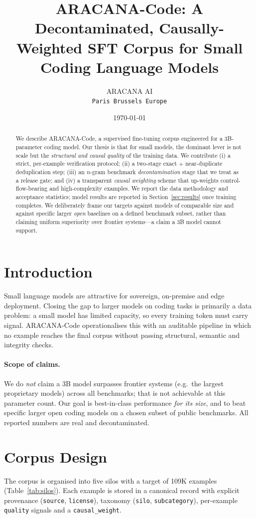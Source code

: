 \documentclass[11pt]{article}
\title{ARACANA-Code: A Decontaminated, Causally-Weighted SFT Corpus for
Small Coding Language Models}
\author{ARACANA AI \\ \texttt{Paris {\textbullet} Brussels {\textbullet} Europe}}
\date{\today}
\begin{document}
\maketitle

\begin{abstract}
We describe ARACANA-Code, a supervised fine-tuning corpus engineered for a
3B-parameter coding model. Our thesis is that for small models, the dominant
lever is not scale but the \emph{structural and causal quality} of the training
data. We contribute (i) a strict, per-example verification protocol; (ii) a
two-stage exact $+$ near-duplicate deduplication step; (iii) an $n$-gram
benchmark \emph{decontamination} stage that we treat as a release gate; and
(iv) a transparent \emph{causal weighting} scheme that up-weights
control-flow-bearing and high-complexity examples. We report the data
methodology and acceptance statistics; model results are reported in
Section~\ref{sec:results} once training completes. We deliberately frame our
targets against models of comparable size and against specific larger
\emph{open} baselines on a defined benchmark subset, rather than claiming
uniform superiority over frontier systems---a claim a 3B model cannot support.
\end{abstract}

\section{Introduction}
Small language models are attractive for sovereign, on-premise and edge
deployment. Closing the gap to larger models on coding tasks is primarily a
data problem: a small model has limited capacity, so every training token must
carry signal. ARACANA-Code operationalises this with an auditable pipeline in
which no example reaches the final corpus without passing structural, semantic
and integrity checks.

\paragraph{Scope of claims.} We do \emph{not} claim a 3B model surpasses
frontier systems (e.g.\ the largest proprietary models) across all benchmarks;
that is not achievable at this parameter count. Our goal is best-in-class
performance \emph{for its size}, and to beat specific larger open coding models
on a chosen subset of public benchmarks. All reported numbers are real and
decontaminated.

\section{Corpus Design}
The corpus is organised into five silos with a target of 109K examples
(Table~\ref{tab:silos}). Each example is stored in a canonical record with
explicit provenance (\texttt{source}, \texttt{license}), taxonomy
(\texttt{silo}, \texttt{subcategory}), per-example \texttt{quality} signals and
a \texttt{causal\_weight}.
\end{document}
